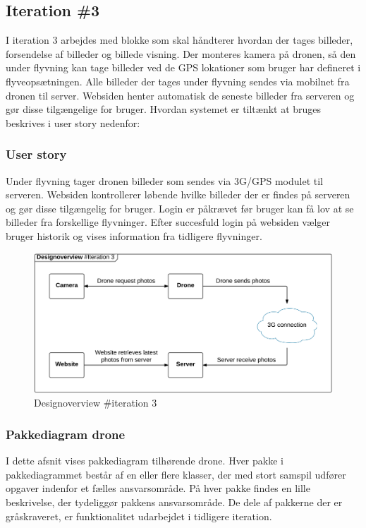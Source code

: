 \subsection{Iteration \#3}
I iteration 3 arbejdes med blokke som skal håndterer hvordan der tages billeder, forsendelse af billeder og billede visning. Der monteres kamera på dronen, så den under flyvning kan tage billeder ved de GPS lokationer som bruger har defineret i flyveopsætningen. Alle billeder der tages under flyvning sendes via mobilnet fra dronen til server. Websiden henter automatisk de seneste billeder fra serveren og gør disse tilgængelige for bruger. Hvordan systemet er tiltænkt at bruges beskrives i user story nedenfor:

\subsubsection*{User story}
Under flyvning tager dronen billeder som sendes via 3G/GPS modulet til serveren. Websiden kontrollerer løbende hvilke billeder der er findes på serveren og gør disse tilgængelig for bruger. Login er påkrævet før bruger kan få lov at se billeder fra forskellige flyvninger. Efter succesfuld login på websiden vælger bruger historik og vises information fra tidligere flyvninger. 

\begin{figure}[H]
	\centering
	\includegraphics[width=1\textwidth]{Billeder/design_overview/design_overview_iteration3.png}
	\vspace{-.5cm}
	\caption{Designoverview \#iteration 3}
	\label{fig:design_overview_UC1}
\end{figure}
\newpage

\newpage
\subsubsection*{Pakkediagram drone}
I dette afsnit vises pakkediagram tilhørende drone. Hver pakke i pakkediagrammet består af en eller flere klasser, der med stort samspil udfører opgaver indenfor et fælles ansvarsområde. 
På hver pakke findes en lille beskrivelse, der tydeliggør pakkens ansvarsområde. De dele af pakkerne der er gråskraveret, er funktionalitet udarbejdet i tidligere iteration.


